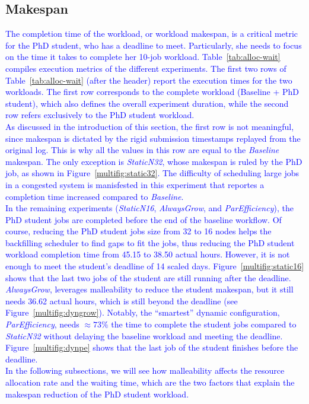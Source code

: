 \documentclass[a4paper,fleqn]{cas-dc}
\newcommand{\review}[1]{\textcolor{blue}{#1}}
\begin{document}
\subsection{Makespan}\label{subsec:makespan}
\review{
The completion time of the workload, or workload makespan, is a critical metric for the PhD student, who has a deadline to meet.
Particularly, she needs to focus on the time it takes to complete her 10-job workload.
Table~\ref{tab:alloc-wait} compiles execution metrics of the different experiments.
The first two rows of Table~\ref{tab:alloc-wait} (after the header) report the execution times for the two workloads. The first row corresponds to the complete workload (Baseline + PhD student), which also defines the overall experiment duration, while the second row refers exclusively to the PhD student workload.
\\\indent
As discussed in the introduction of this section, the first row is not meaningful, since makespan is dictated by the rigid submission timestamps replayed from the original log.
This is why all the values in this row are equal to the \textit{Baseline} makespan.
The only exception is \textit{StaticN32}, whose makespan is ruled by the PhD job, as shown in Figure~\ref{multifig:static32}.
The difficulty of scheduling large jobs in a congested system is manisfested in this experiment that reportes a completion time increased compared to \textit{Baseline}.
\\\indent
In the remaining experiments (\textit{StaticN16}, \textit{AlwaysGrow}, and \textit{ParEfficiency}), the PhD student jobs are completed before the end of the baseline workflow.
Of course, reducing the PhD student jobs size from 32 to 16 nodes helps the backfilling scheduler to find gaps to fit the jobs, thus reducing the PhD student workload completion time from 45.15 to 38.50 actual hours.
However, it is not enough to meet the student's deadline of 14 scaled days.
Figure~\ref{multifig:static16} shows that the last two jobs of the student are still running after the deadline.
\textit{AlwaysGrow}, leverages malleability to reduce the student makespan, but it still needs 36.62 actual hours, which is still beyond the deadline (see Figure~\ref{multifig:dyngrow}).
Notably, the ``smartest'' dynamic configuration, \textit{ParEfficiency}, needs $\approx73\%$ the time to complete the student jobs compared to \textit{StaticN32} without delaying the baseline workload and meeting the deadline.
Figure~\ref{multifig:dynpe} shows that the last job of the student finishes before the deadline.
\\\indent
In the following subsections, we will see how malleability affects the resource allocation rate and the waiting time, which are the two factors that explain the makespan reduction of the PhD student workload.
}
\end{document}
